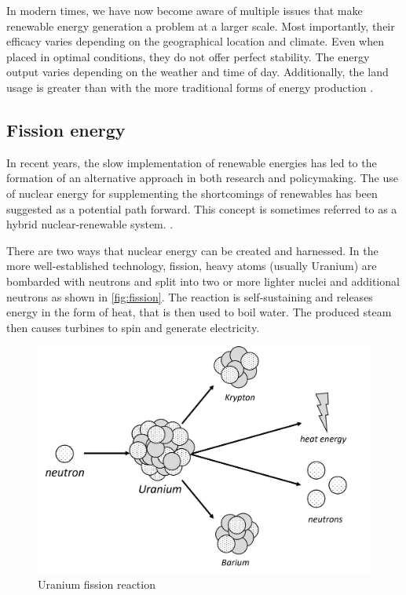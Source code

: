   In modern times, we have now become aware of multiple issues
  that make renewable energy generation a problem at a larger scale.
  Most importantly, their efficacy varies depending on the geographical
  location and climate. Even when placed in optimal conditions,
  they do not offer perfect stability. The energy output varies
  depending on the weather and time of day. Additionally, the land
  usage is greater than with the more traditional forms of energy production
  \cite{renewable_problems}.

\subsection{Fission energy}

  In recent years, the slow implementation of renewable energies has 
  led to the formation of an alternative approach in both research and policymaking. 
  The use of nuclear energy for supplementing the shortcomings 
  of renewables has been suggested as a potential path forward.
  This concept is sometimes referred to as a hybrid nuclear-renewable system.
  \cite{hybrid_nuclear_renewable}. 

  There are two ways that nuclear energy can be created and harnessed.
  In the more well-established technology, fission, heavy atoms 
  (usually Uranium) are bombarded with neutrons 
  and split into two or more lighter nuclei and
  additional neutrons as shown in \autoref{fig:fission}.
  The reaction is self-sustaining 
  and releases energy in the form of heat, that is then used
  to boil water. The produced steam then causes turbines to spin
  and generate electricity.
	\begin{figure}[H]
	  \centering
	  \includegraphics[width=.75\linewidth]{media/fission.png}
	  \caption{Uranium fission reaction}
	  \label{fig:fission}
	\end{figure}

